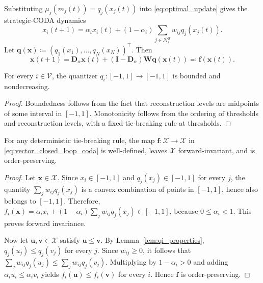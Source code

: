 \documentclass[journal,twoside,web]{ieeecolor}
\begin{document}
Substituting $\mu_j(m_j(t))=q_j(x_j(t))$ into \eqref{eq:optimal_update} gives the strategic-CODA dynamics
\begin{equation}
    \label{eq:closed_loop_dynamics_coda}
    x_i(t+1)
    =
    \alpha_i x_i(t)
    +(1-\alpha_i)\sum_{j\in\mathcal N_i^{\mathrm S}}w_{ij}q_j(x_j(t)).
\end{equation}
Let $\bm q(\bm x)\coloneqq (q_1(x_1),\dots,q_N(x_N))^\top$. Then
\begin{equation}
    \label{eq:vector_closed_loop_coda}
    \bm x(t+1)
    =
    \bm D_\alpha\bm x(t)
    +(\bm I-\bm D_\alpha)\bm W\bm q(\bm x(t))
    \eqqcolon
    \bm f(\bm x(t)).
\end{equation}

\begin{lemma}
    \label{lem:qi_properties}
    For every $i\in\mathcal V$, the quantizer $q_i:[-1,1]\to[-1,1]$ is bounded and nondecreasing.
\end{lemma}

\begin{proof}
    Boundedness follows from the fact that reconstruction levels are midpoints of some interval in $[-1,1]$. Monotonicity follows from the ordering of thresholds and reconstruction levels, with a fixed tie-breaking rule at thresholds.
\end{proof}
\begin{proposition}
    \label{prop:closed_loop_order}
    For any deterministic tie-breaking rule, the map $\bm{f}:\mathcal X\to\mathcal X$ in \eqref{eq:vector_closed_loop_coda} is well-defined, leaves $\mathcal X$ forward-invariant, and is order-preserving.
\end{proposition}

\begin{proof}
    Let $\bm{x}\in\mathcal X$. Since $x_i\in[-1,1]$ and $q_j(x_j)\in[-1,1]$ for every $j$, the quantity $\sum_j w_{ij}q_j(x_j)$ is a convex combination of points in $[-1,1]$, hence also belongs to $[-1,1]$. Therefore, $f_i(\bm{x})= \alpha_i x_i + (1-\alpha_i)\sum_j w_{ij}q_j(x_j) \in [-1,1]$,
    because $0\leq\alpha_i<1$. This proves forward invariance.

    Now let $\bm{u},\bm{v}\in\mathcal X$ satisfy $\bm{u}\le \bm{v}$. By Lemma~\ref{lem:qi_properties}, $q_j(u_j)\le q_j(v_j)$ for every $j$. Since $w_{ij}\ge 0$, it follows that $\sum_j w_{ij}q_j(u_j)\le \sum_j w_{ij}q_j(v_j)$.
    Multiplying by $1-\alpha_i>0$ and adding $\alpha_i u_i\le \alpha_i v_i$ yields $f_i(\bm{u})\le f_i(\bm{v})$ for every $i$. Hence $\bm{f}$ is order-preserving.
\end{proof}
\end{document}
